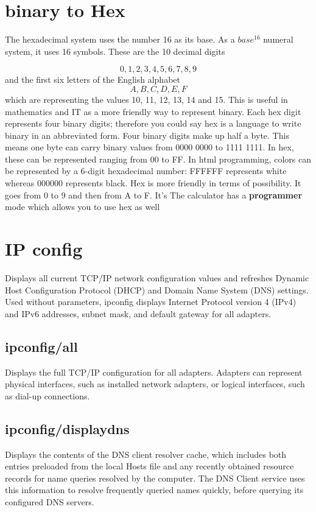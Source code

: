 \documentclass[a4paper,12pt]{article}
\begin{document}
\section{binary to Hex}

The hexadecimal system uses the number 16 as its base. As a $base^{16}$ numeral system, it uses 16 symbols. These are the 10 decimal digits 

\[0, 1, 2, 3, 4, 5, 6, 7, 8, 9\] and the first six letters of the English alphabet \[A, B, C, D, E, F\] which are representing the values 10, 11, 12, 13, 14 and 15.
This is useful in mathematics and IT as a more friendly way to represent binary. Each hex digit represents four binary digits; therefore you could say hex is a language to write binary in an abbreviated form.
Four binary digits make up half a byte. This means one byte can carry binary values from 0000 0000 to 1111 1111. In hex, these can be represented ranging from 00 to FF.
In html programming, colors can be represented by a 6-digit hexadecimal number: FFFFFF represents white whereas 000000 represents black.
Hex is more friendly in terms of possibility. It goes from 0 to 9 and then from A to F. It's 
The calculator has a \textbf{programmer} mode which allows you to use hex as well

\section{IP config}
Displays all current TCP/IP network configuration values and refreshes Dynamic Host Configuration Protocol (DHCP) and Domain Name System (DNS) settings. Used without parameters, ipconfig displays Internet Protocol version 4 (IPv4) and IPv6 addresses, subnet mask, and default gateway for all adapters.

\subsection{ipconfig/all}
Displays the full TCP/IP configuration for all adapters. Adapters can represent physical interfaces, such as installed network adapters, or logical interfaces, such as dial-up connections.

\subsection{ipconfig/displaydns}
Displays the contents of the DNS client resolver cache, which includes both entries preloaded from the local Hosts file and any recently obtained resource records for name queries resolved by the computer. The DNS Client service uses this information to resolve frequently queried names quickly, before querying its configured DNS servers.
\end{document}
